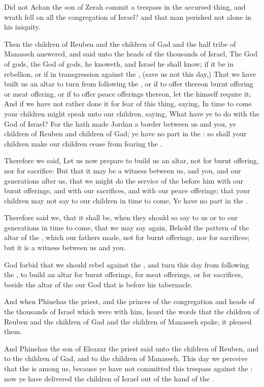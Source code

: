 \verse Did not Achan the son of Zerah commit a trespass in the accursed thing, and wrath fell on all the congregation of Israel? and that man perished not alone in his iniquity.

\verse Then the children of Reuben and the children of Gad and the half tribe of Manasseh answered, and said unto the heads of the thousands of Israel, \verse The \LORD God of gods, the \LORD God of gods, he knoweth, and Israel he shall know; if it be in rebellion, or if in transgression against the \LORD, (save us not this day,) \verse That we have built us an altar to turn from following the \LORD, or if to offer thereon burnt offering or meat offering, or if to offer peace offerings thereon, let the \LORD himself require it; \verse And if we have not rather done it for fear of this thing, saying, In time to come your children might speak unto our children, saying, What have ye to do with the \LORD God of Israel?  \verse For the \LORD hath made Jordan a border between us and you, ye children of Reuben and children of Gad; ye have no part in the \LORD: so shall your children make our children cease from fearing the \LORD.

\verse Therefore we said, Let us now prepare to build us an altar, not for burnt offering, nor for sacrifice: \verse But that it may be a witness between us, and you, and our generations after us, that we might do the service of the \LORD before him with our burnt offerings, and with our sacrifices, and with our peace offerings; that your children may not say to our children in time to come, Ye have no part in the \LORD.

\verse Therefore said we, that it shall be, when they should so say to us or to our generations in time to come, that we may say again, Behold the pattern of the altar of the \LORD, which our fathers made, not for burnt offerings, nor for sacrifices; but it is a witness between us and you.

\verse God forbid that we should rebel against the \LORD, and turn this day from following the \LORD, to build an altar for burnt offerings, for meat offerings, or for sacrifices, beside the altar of the \LORD our God that is before his tabernacle.

\verse And when Phinehas the priest, and the princes of the congregation and heads of the thousands of Israel which were with him, heard the words that the children of Reuben and the children of Gad and the children of Manasseh spake, it pleased them.

\verse And Phinehas the son of Eleazar the priest said unto the children of Reuben, and to the children of Gad, and to the children of Manasseh, This day we perceive that the \LORD is among us, because ye have not committed this trespass against the \LORD: now ye have delivered the children of Israel out of the hand of the \LORD.

